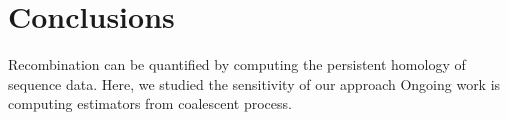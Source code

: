 

\section{Conclusions}
\label{sec:conclusion}
%
Recombination can be quantified by computing the persistent homology of sequence data.
Here, we studied the sensitivity of our approach
Ongoing work is computing estimators from coalescent process.

